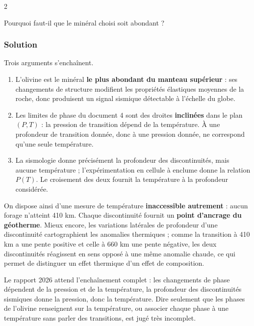 \documentclass[11pt,a4paper]{article}
\providecommand{\tightlist}{\setlength{\itemsep}{0pt}\setlength{\parskip}{0pt}}
\begin{document}
\begin{indication}{2}

Pourquoi faut-il que le minéral choisi soit abondant ?

\end{indication}

\hypertarget{solution-12}{%
\subsubsection{Solution}\label{solution-12}}

Trois arguments s'enchaînent.

\begin{enumerate}
\def\labelenumi{\arabic{enumi}.}
\tightlist
\item
  L'olivine est le minéral \textbf{le plus abondant du manteau supérieur} : ses changements de structure modifient les propriétés élastiques moyennes de la roche, donc produisent un signal sismique détectable à l'échelle du globe.
\item
  Les limites de phase du document 4 sont des droites \textbf{inclinées} dans le plan \((P,T)\) : la pression de transition dépend de la température. À une profondeur de transition donnée, donc à une pression donnée, ne correspond qu'une seule température.
\item
  La sismologie donne précisément la profondeur des discontinuités, mais aucune température ; l'expérimentation en cellule à enclume donne la relation \(P(T)\). Le croisement des deux fournit la température à la profondeur considérée.
\end{enumerate}

On dispose ainsi d'une mesure de température \textbf{inaccessible autrement} : aucun forage n'atteint 410 km. Chaque discontinuité fournit un \textbf{point d'ancrage du géotherme}. Mieux encore, les variations latérales de profondeur d'une discontinuité cartographient les anomalies thermiques ; comme la transition à 410 km a une pente positive et celle à 660 km une pente négative, les deux discontinuités réagissent en sens opposé à une même anomalie chaude, ce qui permet de distinguer un effet thermique d'un effet de composition.

\begin{jury}

Le rapport 2026 attend l'enchaînement complet : les changements de phase dépendent de la pression et de la température, la profondeur des discontinuités sismiques donne la pression, donc la température. Dire seulement que les phases de l'olivine renseignent sur la température, ou associer chaque phase à une température sans parler des transitions, est jugé très incomplet.

\end{jury}
\end{document}
